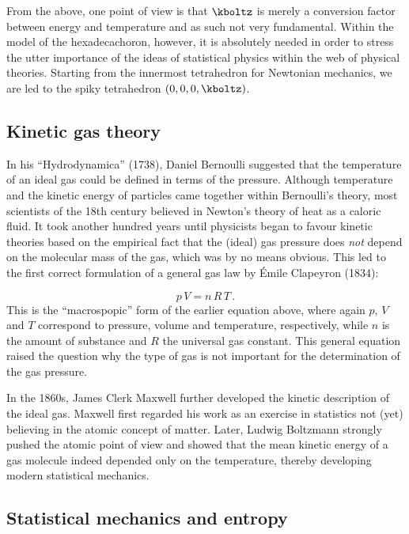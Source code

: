 \documentclass{scrartcl}
\begin{document}
From the above, one point of view is that $\kboltz$ is merely a conversion factor between energy and temperature and as such not very fundamental. Within the model of the hexadecachoron, however, it is absolutely needed in order to stress the utter importance of the ideas of statistical physics within the web of physical theories. Starting from the innermost tetrahedron for Newtonian mechanics, we are led to the spiky tetrahedron $(0,0,0,\kboltz)$.


\subsection*{Kinetic gas theory}

In his \enquote{Hydrodynamica} (1738), Daniel Bernoulli suggested that the temperature of an ideal gas could be defined in terms of the pressure. Although temperature and the kinetic energy of particles came together within Bernoulli's theory, most scientists of the 18th century believed in Newton's theory of heat as a caloric fluid. It took another hundred years until physicists began to favour kinetic theories based on the empirical fact that the (ideal) gas pressure does \emph{not} depend on the molecular mass of the gas, which was by no means obvious. This led to the first correct formulation of a general gas law by Émile Clapeyron (1834):

\begin{equation*}\label{eq:ideal-nr}
  p\, V=n\, R\, T\,.
\end{equation*}
%
This is the \enquote{macrospopic} form of the earlier equation above, where again $p$, $V$ and $T$ correspond to pressure, volume and temperature, respectively, while $n$ is the amount of substance and $R$ the universal gas constant. This general equation raised the question why the type of gas is not important for the determination of the gas pressure.

In the 1860s, James Clerk Maxwell further developed the kinetic description of the ideal gas. Maxwell first regarded his work as an exercise in statistics not (yet) believing in the atomic concept of matter. Later, Ludwig Boltzmann strongly pushed the atomic point of view and showed that the mean kinetic energy of a gas molecule indeed depended only on the temperature, thereby developing modern statistical mechanics.


\subsection*{Statistical mechanics and entropy}
 
\end{document}

